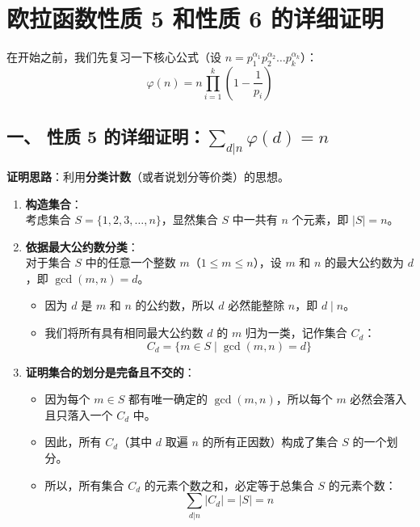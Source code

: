 \documentclass{article}
\begin{document}
\section*{欧拉函数性质 5 和性质 6 的详细证明}

在开始之前，我们先复习一下核心公式（设 \(n = p_1^{\alpha_1} p_2^{\alpha_2} \dots p_k^{\alpha_k}\)）：
\[
 \varphi(n) = n \prod_{i=1}^k \left(1 - \frac{1}{p_i}\right) 
\]

\subsection*{一、 性质 5 的详细证明：\(\sum_{d|n} \varphi(d) = n\)}

\textbf{证明思路}：利用\textbf{分类计数}（或者说划分等价类）的思想。

\begin{enumerate}
    \item \textbf{构造集合}：\\
    考虑集合 \(S = \{1, 2, 3, \dots, n\}\)，显然集合 \(S\) 中一共有 \(n\) 个元素，即 \(|S| = n\)。

    \item \textbf{依据最大公约数分类}：\\
    对于集合 \(S\) 中的任意一个整数 \(m\)（\(1 \le m \le n\)），设 \(m\) 和 \(n\) 的最大公约数为 \(d\)，即 \(\gcd(m, n) = d\)。
    \begin{itemize}
        \item 因为 \(d\) 是 \(m\) 和 \(n\) 的公约数，所以 \(d\) 必然能整除 \(n\)，即 \(d \mid n\)。
        \item 我们将所有具有相同最大公约数 \(d\) 的 \(m\) 归为一类，记作集合 \(C_d\)：
        \[
 C_d = \{ m \in S \mid \gcd(m, n) = d \} 
\]
    \end{itemize}

    \item \textbf{证明集合的划分是完备且不交的}：\\
    \begin{itemize}
        \item 因为每个 \(m \in S\) 都有唯一确定的 \(\gcd(m, n)\)，所以每个 \(m\) 必然会落入且只落入一个 \(C_d\) 中。
        \item 因此，所有 \(C_d\)（其中 \(d\) 取遍 \(n\) 的所有正因数）构成了集合 \(S\) 的一个划分。
        \item 所以，所有集合 \(C_d\) 的元素个数之和，必定等于总集合 \(S\) 的元素个数：
        \[
 \sum_{d|n} |C_d| = |S| = n 
\]
    \end{itemize}


\end{enumerate}
\end{document}
